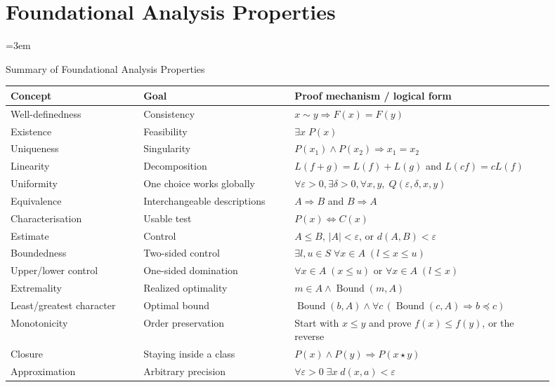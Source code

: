 
\section{Foundational Analysis Properties}
\label{sec:foundational-analysis-properties}

\begingroup
\sloppy
\emergencystretch=3em

\begin{toolkitbox}{Summary of Foundational Analysis Properties}
\small
\begin{tabular}{p{0.22\linewidth} p{0.25\linewidth} p{0.43\linewidth}}
\toprule
\textbf{Concept} & \textbf{Goal} & \textbf{Proof mechanism / logical form} \\
\midrule
Well-definedness
  & Consistency
  & $x\sim y \Rightarrow F(x)=F(y)$ \\
Existence
  & Feasibility
  & $\exists x\;P(x)$ \\
Uniqueness
  & Singularity
  & $P(x_1)\land P(x_2)\Rightarrow x_1=x_2$ \\
Linearity
  & Decomposition
  & $L(f+g)=L(f)+L(g)$ and $L(cf)=cL(f)$ \\
Uniformity
  & One choice works globally
  & $\forall\varepsilon>0,\exists\delta>0,\forall x,y,\;Q(\varepsilon,\delta,x,y)$ \\
Equivalence
  & Interchangeable descriptions
  & $A\Rightarrow B$ and $B\Rightarrow A$ \\
Characterisation
  & Usable test
  & $P(x)\Longleftrightarrow C(x)$ \\
Estimate
  & Control
  & $A\leq B$, $|A|<\varepsilon$, or $d(A,B)<\varepsilon$ \\
Boundedness
  & Two-sided control
  & $\exists l,u\in S\;\forall x\in A\;(l\leq x\leq u)$ \\
Upper/lower control
  & One-sided domination
  & $\forall x\in A\;(x\leq u)$ or $\forall x\in A\;(l\leq x)$ \\
Extremality
  & Realized optimality
  & $m\in A\land \operatorname{Bound}(m,A)$ \\
Least/greatest character
  & Optimal bound
  & $\operatorname{Bound}(b,A)\land \forall c\,(\operatorname{Bound}(c,A)\Rightarrow b\preceq c)$ \\
Monotonicity
  & Order preservation
  & Start with $x\leq y$ and prove $f(x)\leq f(y)$, or the reverse \\
Closure
  & Staying inside a class
  & $P(x)\land P(y)\Rightarrow P(x\star y)$ \\
Approximation
  & Arbitrary precision
  & $\forall\varepsilon>0\;\exists x\;d(x,a)<\varepsilon$ \\
\bottomrule
\end{tabular}
\end{toolkitbox}

